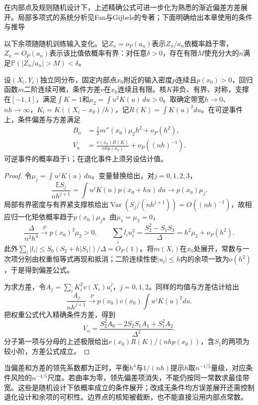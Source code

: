 在内部点及规则随机设计下，上述精确公式可进一步化为熟悉的渐近偏差方差展开。局部多项式的系统分析见Fan与Gijbels的专著；下面明确给出本章使用的条件与推导

以下余项随随机训练输入变化。记$Z_n=o_P(a_n)$表示$Z_n/a_n$依概率趋于零，$Z_n=O_P(a_n)$表示该比值依概率有界：对任意$\delta>0$，存在有限$M$使充分大的$n$满足$\mathbb{P}(|Z_n/a_n|>M)<\delta$。

\begin{theorem}[一维内部点的局部线性展开]
  \label{thm:regression-local-asymptotic}
  设$(X_i,Y_i)$独立同分布，固定内部点$x_0$附近的输入密度$p$连续且$p(x_0)>0$，回归函数$m$二阶连续可微，条件方差$v$在$x_0$连续且有限。核$K$非负、有界、对称，支撑在$[-1,1]$，满足$\int K=1$和$\mu_2=\int u^2K(u)\,du>0$。取确定带宽$h\to0$、$nh\to\infty$，$K_i=K((X_i-x_0)/h)$，记$R(K)=\int K(u)^2du$。在可逆事件上，条件偏差与方差满足
  \begin{align*}
    B_n&=\tfrac12 m''(x_0)\mu_2h^2+o_P(h^2),\\
    V_n&=\frac{v(x_0)R(K)}{nhp(x_0)}+o_P((nh)^{-1}).
  \end{align*}
  可逆事件的概率趋于$1$；在退化事件上须另设估计值。
\end{theorem}

\begin{proof}
令$\mu_j=\int u^jK(u)\,du$。变量替换给出，对$j=0,1,2,3$，
\[
  \frac{\mathbb{E}S_j}{nh^{j+1}}
  =\int u^jK(u)p(x_0+hu)\,du\longrightarrow p(x_0)\mu_j.
\]
局部有界密度与有界紧支撑核给出$\operatorname{Var}(S_j/(nh^{j+1}))=O((nh)^{-1})$，故相应归一化矩依概率趋于$p(x_0)\mu_j$。由$\mu_1=\mu_3=0$，
\[
  \frac{\Delta}{n^2h^4}\xrightarrow{P}p(x_0)^2\mu_2>0,\qquad
  \sum_i l_i u_i^2
    =\frac{S_2^2-S_1S_3}{\Delta}
    =h^2\mu_2+o_P(h^2).
\]
此外$\sum_i|l_i|\leq S_0(S_2+h|S_1|)/\Delta=O_P(1)$。将$m(X_i)$在$x_0$处展开，常数与一次项分别由权重恒等式再现和抵消；二阶连续性使$|u_i|\leq h$内的余项一致为$o(h^2)$，于是得到偏差公式。

为求方差，令$A_j=\sum_iK_i^2v(X_i)u_i^j$，$j=0,1,2$。同样的均值与方差估计给出
\[
  \frac{A_j}{nh^{j+1}}
    \xrightarrow{P}p(x_0)v(x_0)\int u^jK(u)^2du.
\]
把权重公式代入精确条件方差，得到
\[
  V_n=\frac{S_2^2A_0-2S_2S_1A_1+S_1^2A_2}{\Delta^2}.
\]
分子第一项与分母的上述极限给出$v(x_0)R(K)/(nhp(x_0))$，含$S_1$的两项为较小阶，方差公式成立。
\end{proof}

当偏差和方差的领先系数都为正时，平衡$h^4$与$1/(nh)$提示$h$取$n^{-1/5}$量级，对应条件风险的$n^{-4/5}$尺度。若曲率为零，领先偏差项消失，不能仍按同一常数求最佳带宽。这些是随机设计下依概率成立的条件展开；改成无条件均方误差展开还需控制退化设计和余项的可积性。边界点的核矩被截断，也不能直接沿用内部点常数。

